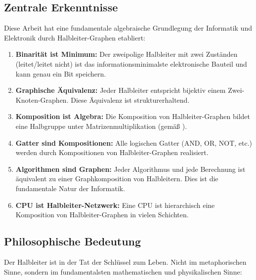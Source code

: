 \documentclass[12pt, a4paper]{article}
\theoremstyle{definition}
\theoremstyle{remark}
\begin{document}
\subsection{Zentrale Erkenntnisse}
\label{subsec:erkenntnisse}

Diese Arbeit hat eine fundamentale algebraische Grundlegung der Informatik und Elektronik durch Halbleiter-Graphen etabliert:

\begin{enumerate}[label=(\roman*)]
  \item \textbf{Binarität ist Minimum:} Der zweipolige Halbleiter mit zwei Zuständen (leitet/leitet nicht) ist das informationsminimalste elektronische Bauteil und kann genau ein Bit speichern.

  \item \textbf{Graphische Äquivalenz:} Jeder Halbleiter entspricht bijektiv einem Zwei-Knoten-Graphen. Diese Äquivalenz ist strukturerhaltend.

  \item \textbf{Komposition ist Algebra:} Die Komposition von Halbleiter-Graphen bildet eine Halbgruppe unter Matrizenmultiplikation (gemäß \cite{epp2026matrgraph}).

  \item \textbf{Gatter sind Kompositionen:} Alle logischen Gatter (AND, OR, NOT, etc.) werden durch Kompositionen von Halbleiter-Graphen realisiert.

  \item \textbf{Algorithmen sind Graphen:} Jeder Algorithmus und jede Berechnung ist äquivalent zu einer Graphkomposition von Halbleitern. Dies ist die fundamentale Natur der Informatik.

  \item \textbf{CPU ist Halbleiter-Netzwerk:} Eine CPU ist hierarchisch eine Komposition von Halbleiter-Graphen in vielen Schichten.
\end{enumerate}

\subsection{Philosophische Bedeutung}
\label{subsec:philosophie}

Der Halbleiter ist in der Tat der Schlüssel zum Leben. Nicht im metaphorischen Sinne, sondern im fundamentalsten mathematischen und physikalischen Sinne:
\end{document}
